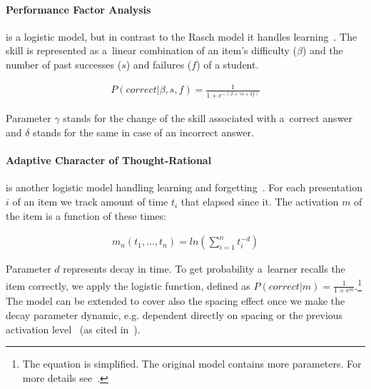 \documentclass[table,color,cover,twoside,nolot,nolof]{fithesis3/fithesis3}
\begin{document}
\paragraph*{Performance Factor Analysis} is a logistic model, but in contrast
to the Rasch model it handles learning~\cite{pavlik2009performance}. The
skill is represented as a~linear combination of an item's difficulty ($\beta$)
and the number of past successes ($s$) and failures ($f$) of a student.

\begin{align}
P(correct|\beta,s, f) = \frac{1}{1 + e^{-(\beta + \gamma s + \delta f)}}
\end{align}

Parameter $\gamma$ stands for the change of the skill associated with a~correct
answer and $\delta$ stands for the same in case of an incorrect answer.

\paragraph*{Adaptive Character of Thought-Rational} is another logistic model
handling learning and forgetting~\cite{pavlik2005practice}. For each
presentation $i$ of an item we track amount of time $t_i$ that elapsed since
it. The activation $m$ of the item is a function of these times:

\begin{align}
m_n(t_1, \ldots, t_n) = ln\left(\sum_{i=1}^n t_i^{-d}\right)
\end{align}

Parameter $d$ represents decay in time. To get probability a~learner recalls
the item correctly, we apply the logistic function, defined as $P(correct|m) = \frac{1}{1
+ e^{m}}$.\footnote{The equation is simplified. The original model contains more parameters. For more details see~\cite{pavlik2005practice}.} The model can be extended to cover also the spacing
effect once we make the decay parameter dynamic, e.g. dependent directly on
spacing or the previous activation level~\cite{anderson1991reflections} (as
cited in~\cite{pavlik2005practice}).

\bigskip
\end{document}
